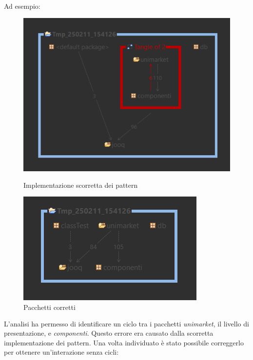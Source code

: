 \documentclass[a4paper,12pt]{article}
\begin{document}
Ad esempio:
\begin{figure}[H]
    \centering
    \begin{minipage}{0.45\textwidth}
        \centering
        \includegraphics[width=\textwidth]{../Media/STAN/cicloPacchetti.png}
        \caption{Implementazione scorretta dei pattern}
        \label{fig:cicloPacchetti}
    \end{minipage}
    \hfill
    \begin{minipage}{0.45\textwidth}
        \centering
        \includegraphics[width=\textwidth]{../Media/STAN/pacchetti.png}
        \caption{Pacchetti corretti}
        \label{fig:pacchetti}
    \end{minipage}
\end{figure}

L'analisi ha permesso di identificare un ciclo tra i pacchetti \textit{unimarket}, il livello di presentazione, e \textit{componenti}. 
Questo errore era causato dalla scorretta implementazione dei pattern. Una volta individuato è stato possibile correggerlo per ottenere un'interazione senza cicli:
\end{document}
